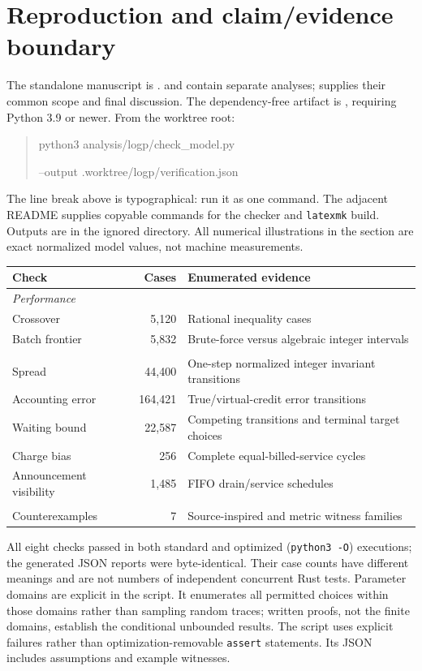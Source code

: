 \section{Reproduction and claim/evidence boundary}
\label{app:artifact}
The standalone manuscript is .
 and  contain separate analyses;
 supplies their common scope and final discussion.
The dependency-free artifact is ,
requiring Python 3.9 or newer. From the
worktree root:
\begin{quote}\ttfamily\small
python3 analysis/logp/check\_model.py\par
\quad --output .worktree/logp/verification.json
\end{quote}
The line break above is typographical: run it as one command. The adjacent
README supplies copyable commands for the checker and \texttt{latexmk} build.
Outputs are in the ignored  directory. All numerical
illustrations in the section are exact normalized model values, not machine
measurements.

\begin{center}\small
\begin{tabular}{lrl}
\toprule
Check & Cases & Enumerated evidence \\
\midrule
\multicolumn{3}{l}{\emph{Performance}}\\
Crossover &5,120& Rational inequality cases \\
Batch frontier &5,832& Brute-force versus algebraic integer intervals \\
\addlinespace
\multicolumn{3}{l}{\emph{Fairness}}\\
Spread &44,400& One-step normalized integer invariant transitions \\
Accounting error &164,421& True/virtual-credit error transitions \\
Waiting bound &22,587& Competing transitions and terminal target choices \\
Charge bias &256& Complete equal-billed-service cycles \\
Announcement visibility &1,485& FIFO drain/service schedules \\
\addlinespace
\multicolumn{3}{l}{\emph{Cross-checks}}\\
Counterexamples &7& Source-inspired and metric witness families \\
\bottomrule
\end{tabular}
\end{center}
All eight checks passed in both standard and optimized (\texttt{python3 -O})
executions; the generated JSON reports were byte-identical. Their case counts
have different meanings and are not numbers of independent concurrent Rust
tests. Parameter domains are explicit in the script. It enumerates all
permitted choices within those domains rather than sampling random traces;
written proofs, not the finite domains, establish the conditional unbounded
results. The script uses explicit failures rather than optimization-removable
\texttt{assert} statements. Its JSON includes assumptions and example witnesses.

